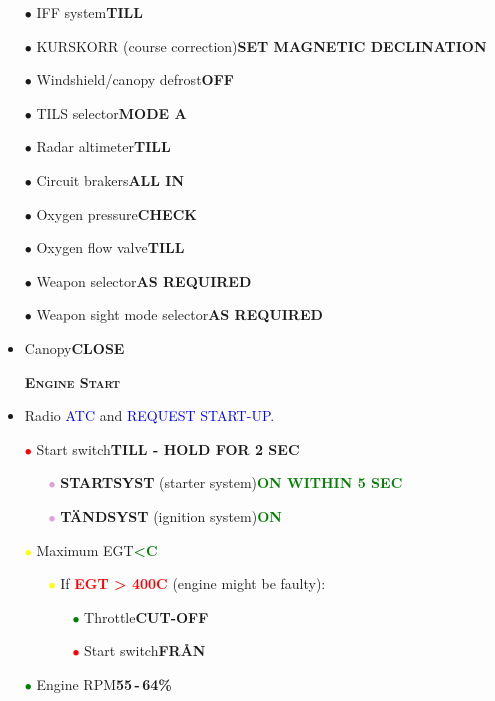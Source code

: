 \documentclass[a4paper,12pt,dvipsnames]{letter}
\newcommand{\oranb}[1]{\textcolor{BurntOrange} {\textbf{#1}}}
\newcommand{\radio}[1]{\textcolor{blue}{#1}}
\newcommand{\button}[1]{\textbf{#1}}
\newcommand{\degC}{\textdegree{}C}
\newcommand{\ok}[1]{\textcolor{Green}{\textbf{#1}}}
\newcommand{\warn}[1]{\textcolor{Red}{\textbf{#1}}}
\newcommand{\myHead}[1]{{\LARGE\textsc{\textbf{#1}}}}
\newcommand{\bi}{\textcolor{ProcessBlue}{$\bullet$\;}}
\newcommand{\ri}{\textcolor{red}{$\bullet$\;}}
\newcommand{\gi}{\textcolor{Green}{$\bullet$\;}}
\newcommand{\yi}{\textcolor{Yellow}{$\bullet$\;}}
\newcommand{\vi}{\textcolor{Plum}{$\bullet$\;}}
\begin{document}
{\begin{itemize}
 \item[\bi] IFF system\dotfill\button{TILL}
 \item[\bi] KURSKORR (course correction)\dotfill\button{SET MAGNETIC DECLINATION}
 \item[\bi] Windshield/canopy defrost\dotfill\button{OFF}
 \item[\bi] TILS selector\dotfill\button{MODE A}
 \item[\bi] Radar altimeter\dotfill\button{TILL}
 \item[\bi] Circuit brakers\dotfill\button{ALL IN}
 \item[\bi] Oxygen pressure\dotfill\button{CHECK}
 \item[\bi] Oxygen flow valve\dotfill\button{TILL}
 \item[\bi] Weapon selector\dotfill\button{AS REQUIRED}
 \item[\bi] Weapon sight mode selector\dotfill\button{AS REQUIRED}
 \item Canopy\dotfill\button{CLOSE}
\end{itemize}
\newpage
\begin{itemize}
 \item[] \myHead{Engine Start}
 \item Radio \radio{ATC} and \radio{REQUEST START-UP}.
 \item[\ri] Start switch\dotfill\button{TILL - HOLD FOR 2 SEC}
 \begin{itemize}
  \item[\vi] \oranb{STARTSYST} (starter system)\dotfill\ok{ON WITHIN 5 SEC}
  \item[\vi] \oranb{TÄNDSYST} (ignition system)\dotfill\ok{ON}
 \end{itemize}
 \item[\yi] Maximum EGT\dotfill\ok{\textless{}\degC}
 \begin{itemize}
  \item[\yi] If \warn{EGT > 400\degC} (engine might be faulty):
  \begin{itemize}
   \item[\gi] Throttle\dotfill\button{CUT-OFF}
   \item[\ri] Start switch\dotfill\button{FR\AA N}
  \end{itemize}
 \end{itemize}
 \item[\gi] Engine RPM\dotfill\button{55\,-\,64\%}
 \begin{itemize}

\end{itemize}
\end{itemize}}
\end{document}
